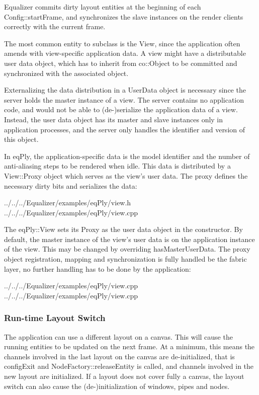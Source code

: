 \documentclass[10pt,a4]{scrartcl}
\begin{document}
Equalizer commits dirty layout entities at the beginning of each
\textsf{Config::startFrame}, and synchronizes the slave instances on the
render clients correctly with the current frame.

The most common entity to subclass is the \textsf{View}, since the application
often amends with view-specific application data. A view might have a
distributable user data object, which has to inherit from \textsf{co::Object} to
be committed and synchronized with the associated object.

Externalizing the data distribution in a \textsf{UserData} object is necessary
since the server holds the master instance of a view. The server contains no
application code, and would not be able to (de-)serialize the application data
of a view. Instead, the user data object has its master and slave instances only
in application processes, and the server only handles the identifier and version
of this object.

In \textsf{eqPly}, the application-specific data is the model identifier and the
number of anti-aliasing steps to be rendered when idle. This data is distributed
by a \textsf{View::Proxy} object which serves as the view's user data. The proxy
defines the necessary dirty bits and serializes the data:

{\footnotesize
  {../../../Equalizer/examples/eqPly/view.h}}
{\footnotesize
  {../../../Equalizer/examples/eqPly/view.cpp}}

The \textsf{eqPly::View} sets its \textsf{Proxy} as the user data object in the
constructor. By default, the master instance of the view's user data is on the
application instance of the view. This may be changed by overriding
\textsf{hasMasterUserData}. The proxy object registration, mapping and
synchronization is fully handled be the \textsf{fabric} layer, no further
handling has to be done by the application:

{\footnotesize
  {../../../Equalizer/examples/eqPly/view.cpp}}
{\footnotesize
  {../../../Equalizer/examples/eqPly/view.cpp}}

\subsubsection{Run-time Layout Switch}

The application can use a different layout on a canvas. This will cause
the running entities to be updated on the next frame. At a minimum, this
means the channels involved in the last layout on the canvas are
de-initialized, that is \textsf{configExit} and
\textsf{NodeFactory::releaseEntity} is called, and channels involved in
the new layout are initialized. If a layout does not cover fully a
canvas, the layout switch can also cause the (de-)initialization of
windows, pipes and nodes.
\end{document}
